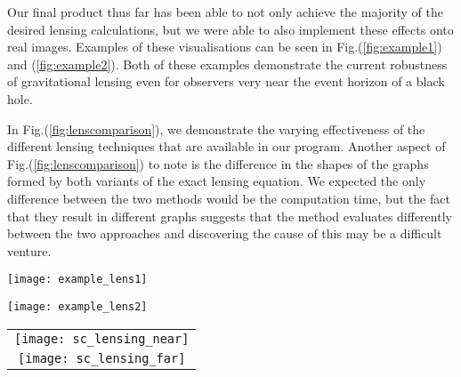 \documentclass{standalone}
\begin{document}
Our final product thus far has been able to not only achieve the majority of the desired lensing calculations, but we were able to also implement these effects onto real images.
Examples of these visualisations can be seen in Fig.(\ref{fig:example1}) and (\ref{fig:example2}).
Both of these examples demonstrate the current robustness of gravitational lensing even for observers very near the event horizon of a black hole.

In Fig.(\ref{fig:lenscomparison}), we demonstrate the varying effectiveness of the different lensing techniques that are available in our program.
Another aspect of Fig.(\ref{fig:lenscomparison}) to note is the difference in the shapes of the graphs formed by both variants of the exact lensing equation.
We expected the only difference between the two methods would be the computation time, but the fact that they result in different graphs suggests that the  method evaluates differently between the two approaches and discovering the cause of this may be a difficult venture.

\begin{figure*}
  \caption{\label{fig:example1}
    Final result of applying the explicit Schwarzschild lensing map on a sample image using a Schwarzschild space-time defined by $M=1.0$ and $r_O=10M$.
    In this example, one can easily see the problematic image tearing at the $\pi/2$ and $-\pi/2$ meridians.
  }
  \texttt{[image: example\_lens1]}
\end{figure*}

\begin{figure*}
  \caption{\label{fig:example2}
    Second example of a generated Schwarzschild lensing map using the same space-time as in Fig.(\ref{fig:example1}) but at a radius of $r_O=2.5M$, which is significantly closer to the event horizon.
    The accuracy of this result hasn't yet been scrutinized, however the overall converging of the observer's sky to the point at $\phi=0$ is to be expected.
  }
  \texttt{[image: example\_lens2]}
\end{figure*}

\begin{figure*}
  \caption{\label{fig:lenscomparison}
    Comparison between the three levels of generality in the Schwarzschild lensing equation, with the resultant angles shifted vertically by a factor of $\pi$ for clarity.
    The first graph accentuates the differences between the methods near the singularity, while the latter graph shows how the errors of the first decrease as the radius of the observer increases.
  }
  \begin{tabular}{c}
    \texttt{[image: sc\_lensing\_near]}\\
    \texttt{[image: sc\_lensing\_far]}
  \end{tabular}
\end{figure*}
\end{document}
